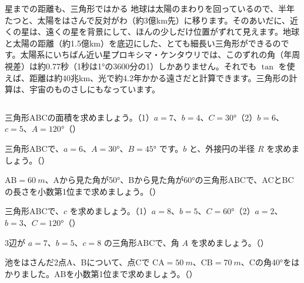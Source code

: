 \begin{column}{星までの距離も、三角形ではかる}
地球は太陽のまわりを回っているので、半年たつと、太陽をはさんで反対がわ（約3億km先）に移ります。そのあいだに、近くの星は、遠くの星を背景にして、ほんの少しだけ位置がずれて見えます。地球と太陽の距離（約1.5億km）を底辺にした、とても細長い三角形ができるのです。太陽系にいちばん近い星プロキシマ・ケンタウリでは、このずれの角（年周視差）は約0.77秒（1秒は\ang{1}の3600分の1）しかありません。それでも $\tan$ を使えば、距離は約40兆km、光で約4.2年かかる遠さだと計算できます。三角形の計算は、宇宙のものさしにもなっています。
\end{column}

\bkendproblems
{}

\bkproblem 三角形ABCの面積を求めましょう。\quad（1）$a=7$、$b=4$、$C=\ang{30}$\quad（2）$b=6$、$c=5$、$A=\ang{120}$\mbox{（）}

\bkproblem 三角形ABCで、$a=6$、$A=\ang{30}$、$B=\ang{45}$ です。$b$ と、外接円の半径 $R$ を求めましょう。\mbox{（）}

\bkproblem $\mathrm{AB}=\qty{60}{m}$、Aから見た角が\ang{50}、Bから見た角が\ang{60}の三角形ABCで、ACとBCの長さを小数第1位まで求めましょう。\mbox{（）}

\bkproblem 三角形ABCで、$c$ を求めましょう。\quad（1）$a=8$、$b=5$、$C=\ang{60}$\quad（2）$a=2$、$b=3$、$C=\ang{120}$\mbox{（）}

\bkproblem 3辺が $a=7$、$b=5$、$c=8$ の三角形ABCで、角 $A$ を求めましょう。\mbox{（）}

\bkproblem 池をはさんだ2点A、Bについて、点Cで $\mathrm{CA}=\qty{50}{m}$、$\mathrm{CB}=\qty{70}{m}$、Cの角\ang{40}をはかりました。ABを小数第1位まで求めましょう。\mbox{（）}

